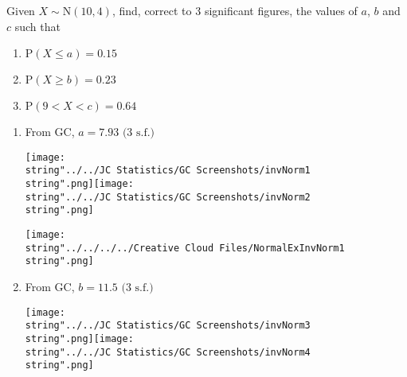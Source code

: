 \documentclass[11pt,a4paper]{book}
\begin{document}
\begin{example}

Given $X\sim\text{N}\left(10,4\right)$, find, correct to 3 significant
figures, the values of $a$, $b$ and $c$ such that

\begin{enumerate}[label=(\alph*)]

\item  $\text{P}\left(X\leq a\right)=0.15$

\item  $\text{P}\left(X\geq b\right)=0.23$

\item  $\text{P}\left(9<X<c\right)=0.64$

\end{enumerate}

\Solution

\begin{enumerate}[label=(\alph*)]

\item

\begin{minipage}[t]{.6\textwidth}

From GC, $a=7.93\text{ (3 s.f.)}$

\texttt{[image: \\string"../../JC Statistics/GC Screenshots/invNorm1\\string".png]}\hspace{1cm}\texttt{[image: \\string"../../JC Statistics/GC Screenshots/invNorm2\\string".png]}

\end{minipage}
\begin{minipage}[t]{.3\textwidth}
\begin{center}
\texttt{[image: \\string"../../../../Creative Cloud Files/NormalExInvNorm1\\string".png]}
\par\end{center}

\end{minipage}

\item  \begin{minipage}[t]{.6\textwidth}

From GC, $b=11.5\text{ (3 s.f.)}$

\texttt{[image: \\string"../../JC Statistics/GC Screenshots/invNorm3\\string".png]}\hspace{1cm}\texttt{[image: \\string"../../JC Statistics/GC Screenshots/invNorm4\\string".png]}


\end{minipage}
\end{enumerate}
\end{example}
\end{document}

